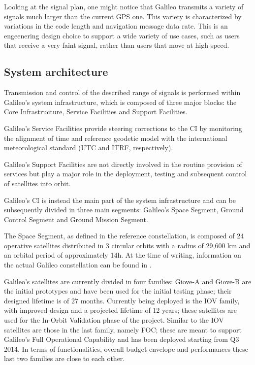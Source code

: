 Looking at the signal plan, one might notice that Galileo transmits a variety of
signals much larger than the current GPS one. This variety is characterized by
variations in the code length and navigation message data rate. This is an
engeenering design choice to support a wide variety of use cases, such as users
that receive a very faint signal, rather than users that move at high speed.

\subsection{System architecture}
Transmission and control of the described range of signals is performed within
Galileo's system infrastructure, which is composed of three major blocks: the
Core Infrastructure, Service Facilities and Support Facilities.

Galileo's Service Facilities provide steering corrections to the CI by
monitoring the alignment of time and reference geodetic model with the
international meteorological standard (UTC and ITRF, respectively).

Galileo's Support Facilities are not directly involved in the routine provision
of services but play a major role in the deployment, testing and subsequent
control of satellites into orbit.

Galileo's CI is instead the main part of the system infrastructure and can be
subsequently divided in three main segments: Galileo's Space Segment, Ground
Control Segment and Ground Mission Segment.

The Space Segment, as defined in the reference constellation, is composed of 24
operative satellites distributed in 3 circular orbits with a radius of 29,600 km
and an orbital period of approximately 14h. At the time of writing, information
on the actual Galileo constellation can be found in \cite{galileo_constellation}.

Galileo's satellites are currently divided in four families: Giove-A and Giove-B
are the initial prototypes and have been used for the initial testing phase;
their designed lifetime is of 27 months. Currently being deployed is the IOV
family, with improved design and a projected lifetime of 12 years; these
satellites are used for the In-Orbit Validation phase of the project. Similar to
the IOV satellites are those in the last family, namely FOC; these are meant to
support Galileo's Full Operational Capability and has been deployed starting
from Q3 2014. In terms of functionalities, overall budget envelope and
performances these last two families are close to each other.


